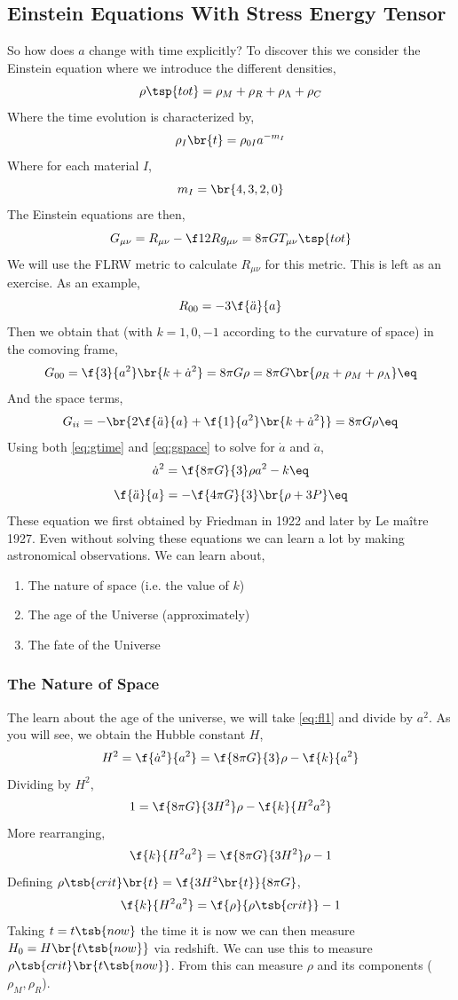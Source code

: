 \documentclass{article}
\begin{document}
\subsection{Einstein Equations With Stress Energy Tensor}

So how does $a$ change with time explicitly? To discover this we consider the Einstein equation where we introduce the different densities,
\[ \rho\tsp{tot} = \rho_M + \rho_R + \rho_{\Lambda} + \rho_C \]
Where the time evolution is characterized by,
\[ \rho_{I}\br{t} = \rho_{0I} a^{-m_I} \]
Where for each material $I$,
\[ m_I = \br{4,3,2,0} \]
The Einstein equations are then,
\[ G_{\mu\nu} = R_{\mu\nu} - \f12 R g_{\mu\nu} = 8 \pi G T_{\mu\nu}\tsp{tot} \]
We will use the FLRW metric to calculate $R_{\mu\nu}$ for this metric. This is left as an exercise. As an example,
\[ R_{00} = - 3 \f{\ddot{a}}{a} \]
Then we obtain that (with $k = 1, 0, -1$ according to the curvature of space) in the comoving frame,
\[ G_{00} = \f{3}{a^2} \br{k + \dot{a}^2} = 8 \pi G \rho = 8\pi G \br{\rho_R + \rho_M + \rho_{\Lambda}} \eq \label{eq:gtime}\]
And the space terms,
\[ G_{ii} = - \br{2 \f{\ddot{a}}{a}  + \f{1}{a^2}\br{k + \dot{a}^2}} = 8 \pi G \rho  \eq \label{eq:gspace}\]
Using both \eqref{eq:gtime} and \eqref{eq:gspace} to solve for $\dot{a}$ and $\ddot{a}$,
\[ \dot{a}^2 = \f{8\pi G}{3} \rho a^2 - k \eq \label{eq:fl1}\]
\[ \f{\ddot{a}}{a} = -\f{4\pi G}{3} \br{\rho + 3 P} \eq \label{eq:fl2}\]
These equation we first obtained by Friedman in 1922 and later by Le maître 1927. Even without solving these equations we can learn a lot by making astronomical observations. We can learn about,
\begin{enumerate}
    \item The nature of space (i.e. the value of $k$)
    \item The age of the Universe (approximately)
    \item The fate of the Universe
\end{enumerate}
\subsubsection{The Nature of Space}
The learn about the age of the universe, we will take \eqref{eq:fl1} and divide by $a^2$. As you will see, we obtain the Hubble constant $H$,
\[ H^2 = \f{\dot{a}^2}{a^2} = \f{8\pi G}{3} \rho - \f{k}{a^2} \]
Dividing by $H^2$,
\[ 1 = \f{8\pi G}{3 H^2} \rho - \f{k}{H^2 a^2} \]
More rearranging,
\[ \f{k}{H^2 a^2} = \f{8\pi G}{3 H^2} \rho - 1 \]
Defining $\rho\tsb{crit}\br{t} = \f{3 H^2\br{t}}{8\pi G}$,
\[ \f{k}{H^2 a^2} = \f{\rho}{\rho\tsb{crit}} - 1 \]
Taking $t = t\tsb{now}$ the time it is now we can then measure $H_0 = H\br{t\tsb{now}}$ via redshift. We can use this to measure $\rho\tsb{crit}\br{t\tsb{now}}$. From this can measure $\rho$ and its components ($\rho_M, \rho_R$). \\
\end{document}
